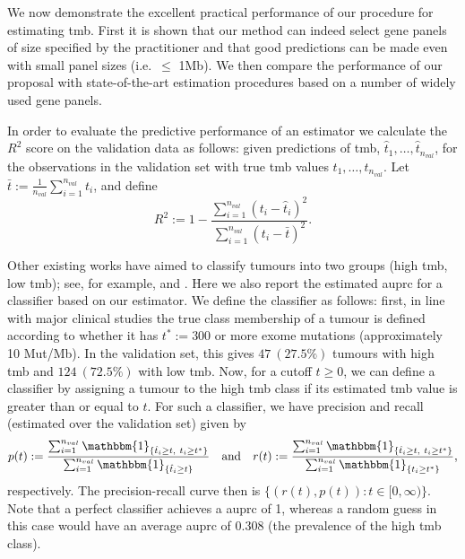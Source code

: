\documentclass[12pt]{article}
\begin{document}
We now demonstrate the excellent practical performance of our procedure for estimating \gls{tmb}.  First it is shown that our method can indeed select gene panels of size specified by the practitioner and that good predictions can be made even with small panel sizes (i.e.~$\leq$ 1Mb). We then compare the performance of our proposal with state-of-the-art estimation procedures based on a number of widely used gene panels.

In order to evaluate the predictive performance of an estimator we calculate the $R^2$ score on the validation data as follows: given predictions of \gls{tmb}, $\hat{t}_1, \ldots, \hat{t}_{n_{val}}$, for the observations in the validation set with true \gls{tmb} values $t_1, \ldots, t_{n_{val}}$. Let $\bar{t} := \frac{1}{n_{val}} \sum_{i=1}^{n_{val}} t_i$, and define 
    \[
    R^2 := 1- \frac{\sum_{i =1}^{n_{val}}(t_i - \hat{t}_i)^2}{\sum_{i = 1}^{n_{val}}(t_i - \bar{t})^2}. 
    \]
    
 Other existing works have aimed to classify tumours into two groups (high \gls{tmb}, low \gls{tmb}); see, for example, \citet{buttner_implementing_2019} and \citet{wu_designing_2019}. Here we also report the estimated \gls{auprc} for a classifier based on our estimator. We define the classifier as follows: first, in line with major clinical studies \citep[e.g.][]{hellmann_nivolumab_2018, ramalingam_tumor_2018} the true class membership of a tumour is defined according to whether it has $t^* := 300$ or more exome mutations (approximately 10 Mut/Mb). In the validation set, this gives $47 \ (27.5 \% )$ tumours with high \gls{tmb} and $124 \ (72.5 \% ) $ with low \gls{tmb}. Now, for a cutoff $t \geq 0$, we can define a classifier by assigning a tumour to the high \gls{tmb} class if its estimated \gls{tmb} value is greater than or equal to $t$.  For such a classifier, we have precision and recall (estimated over the validation set) given by
 \[
 p(t) := \frac{\sum_{i=1}^{n_{val}} \mathbbm{1}_{\{\hat{t}_i \geq t, \ t_i \geq t^*\}}}{\sum_{i=1}^{n_{val}} \mathbbm{1}_{\{\hat{t}_i \geq t\}}} \quad \text{and} \quad   r(t) := \frac{\sum_{i=1}^{n_{val}} \mathbbm{1}_{\{\hat{t}_i \geq t, \ t_i \geq t^*\}}}{\sum_{i=1}^{n_{val}} \mathbbm{1}_{\{t_i \geq t^*\}}},
 \]
respectively.  The precision-recall curve then is $\{(r(t),p(t)): t \in [0, \infty)\}$. Note that a perfect classifier achieves a \gls{auprc} of 1, whereas a random guess in this case would have an average \gls{auprc} of 0.308 (the prevalence of the high \gls{tmb} class).
\end{document}
